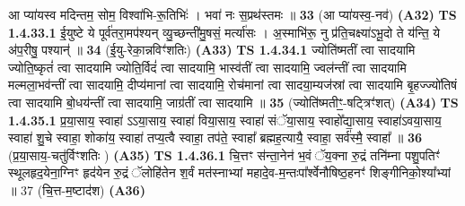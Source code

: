 \documentclass[17pt]{extarticle}
\begin{document}
                  आ प्या॑यस्व मदिन्तम॒ सोम॒ विश्वा॑भि-रू॒तिभिः॑ । भवा॑ नः स॒प्रथ॑स्तमः ॥ \textbf{  33 } \newline
                  \newline
                      (आ प्या॑यस्व॒-नव॑)  \textbf{(A32)} \newline \newline
                                        \textbf{ TS 1.4.33.1} \newline
                  ई॒युष्टे ये पूर्व॑तरा॒मप॑श्यन् व्यु॒च्छन्ती॑मु॒षसं॒ मर्त्या॑सः । अ॒स्माभि॑रू॒ नु प्र॑ति॒चक्ष्या॑ऽभू॒दो ते य॑न्ति॒ ये अ॑प॒रीषु॒ पश्यान्॑ ॥ \textbf{  34 } \newline
                  \newline
                      (ई॒यु-रेका॒न्नविꣳ॑शतिः)  \textbf{(A33)} \newline \newline
                                        \textbf{ TS 1.4.34.1} \newline
                  ज्योति॑ष्मतीं त्वा सादयामि ज्योति॒ष्कृतं॑ त्वा सादयामि ज्योति॒र्विदं॑ त्वा सादयामि॒ भास्व॑तीं त्वा सादयामि॒ ज्वल॑न्तीं त्वा सादयामि मल्मला॒भव॑न्तीं त्वा सादयामि॒ दीप्य॑मानां त्वा सादयामि॒ रोच॑मानां त्वा सादया॒म्यज॑स्रां त्वा सादयामि बृ॒हज्ज्यो॑तिषं त्वा सादयामि बो॒धय॑न्तीं त्वा सादयामि॒ जाग्र॑तीं त्वा सादयामि ॥ \textbf{  35 } \newline
                  \newline
                      (ज्योति॑ष्मतीꣳ॒॒-षट्त्रिꣳ॑शत्)  \textbf{(A34)} \newline \newline
                                        \textbf{ TS 1.4.35.1} \newline
                  प्र॒या॒साय॒ स्वाहा॑ ऽऽया॒साय॒ स्वाहा॑ विया॒साय॒ स्वाहा॑ संॅया॒साय॒ स्वाहो᳚द्या॒साय॒ स्वाहा॑ऽवया॒साय॒ स्वाहा॑ शु॒चे स्वाहा॒ शोका॑य॒ स्वाहा॑ तप्य॒त्वै स्वाहा॒ तप॑ते॒ स्वाहा᳚ ब्रह्मह॒त्यायै॒ स्वाहा॒ सर्व॑स्मै॒ स्वाहा᳚ ॥ \textbf{  36 } \newline
                  \newline
                      (प्र॒या॒साय॒-चतु॑र्विꣳशतिः )  \textbf{(A35)} \newline \newline
                                        \textbf{ TS 1.4.36.1} \newline
                   \textbf{ } \newline
                  \newline
                      चि॒त्तꣳ स॑न्ता॒नेन॑ भ॒वं ॅय॒क्ना रु॒द्रं तनि॑म्ना पशु॒पतिꣳ॑ स्थूलहृद॒येना॒ग्निꣳ हृद॑येन रु॒द्रं ॅलोहि॑तेन श॒र्वं मत॑स्नाभ्यां महादे॒व-म॒न्तःपा᳚र्श्वेनौषिष्ठ॒हनꣳ॑ शिङ्गीनिको॒श्या᳚भ्यां ॥ 37 (चि॒त्त-म॒ष्टाद॑श)  \textbf{(A36)} \newline \newline
\end{document}
